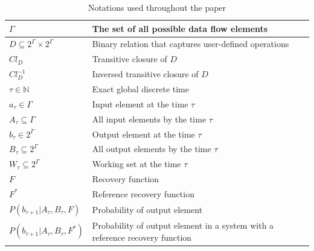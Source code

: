 \begin{table}[!b]
\begin {center}
    \caption{Notations used throughout the paper}
    \begin{tabular}{l|p{5cm}}
        \hline
        $\Gamma$ & The set of all possible data flow elements \\ 
        \hline
        $D\subseteq{2^{\Gamma}\times2^{\Gamma}}$ & Binary relation that captures user-defined operations  \\
        \hline
        $Cl_D$ & Transitive closure of $D$  \\
        \hline
        $Cl^{-1}_D$ & Inversed transitive closure of $D$  \\
        \hline
        $\tau \in \mathbb{N}$ & Exact global discrete time \\
        \hline
        $a_\tau \in \Gamma$ & Input element at the time $\tau$ \\
        \hline
        $A_\tau \subseteq \Gamma$ & All input elements by the time $\tau$ \\
        \hline
        $b_\tau \in 2^{\Gamma}$ & Output element at the time $\tau$ \\
        \hline
        $B_\tau \subseteq 2^{\Gamma}$ & All output elements by the time $\tau$ \\
        \hline
        $W_\tau \subseteq 2^{\Gamma}$ & Working set at the time $\tau$ \\
        \hline
        $F$ & Recovery function \\
        \hline
        $F^{*}$ & Reference recovery function \\
        \hline
        $P(b_{\tau+1}|A_{\tau}, B_\tau, F)$ & Probability of output element \\
        \hline
        $P(b_{\tau+1}|A_{\tau}, B_\tau, F^{*})$ & Probability of output element in a system with a reference recovery function \\
    \end{tabular}
    \label{notations}
\end {center}
\end{table}


